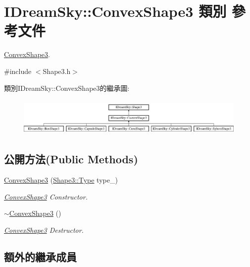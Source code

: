 \hypertarget{class_i_dream_sky_1_1_convex_shape3}{}\section{I\+Dream\+Sky\+:\+:Convex\+Shape3 類別 參考文件}
\label{class_i_dream_sky_1_1_convex_shape3}


\hyperlink{class_i_dream_sky_1_1_convex_shape3}{Convex\+Shape3}.  




{\ttfamily \#include $<$Shape3.\+h$>$}

類別\+I\+Dream\+Sky\+:\+:Convex\+Shape3的繼承圖\+:\begin{figure}[H]
\begin{center}
\leavevmode
\includegraphics[height=1.887640cm]{class_i_dream_sky_1_1_convex_shape3}
\end{center}
\end{figure}
\subsection*{公開方法(Public Methods)}
\begin{DoxyCompactItemize}
\item 
\hyperlink{class_i_dream_sky_1_1_convex_shape3_aa9020a3f3882c5d2ed153f63d77f1c95}{Convex\+Shape3} (\hyperlink{class_i_dream_sky_1_1_shape3_afabf580a0794194e29eb14495ead7ae9}{Shape3\+::\+Type} type\+\_\+)
\begin{DoxyCompactList}\small\item\em \hyperlink{class_i_dream_sky_1_1_convex_shape3}{Convex\+Shape3} Constructor. \end{DoxyCompactList}\item 
\hyperlink{class_i_dream_sky_1_1_convex_shape3_a6c21a09ee4e802bdbf56c630ce81c3fb}{$\sim$\+Convex\+Shape3} ()
\begin{DoxyCompactList}\small\item\em \hyperlink{class_i_dream_sky_1_1_convex_shape3}{Convex\+Shape3} Destructor. \end{DoxyCompactList}\end{DoxyCompactItemize}
\subsection*{額外的繼承成員}


